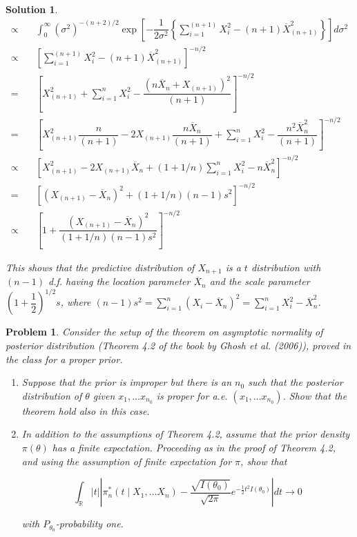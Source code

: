 \documentclass[12pt]{article}
\theoremstyle{problemstyle}
\newtheorem{pbm}{Problem}
\newtheorem*{solution*}{Solution}
\newenvironment{problem}{
\begin{tcolorbox}[colback=green!10!white,colframe=black!75!black, parbox = false]\begin{pbm} }{\end{pbm}\end{tcolorbox} }
\newcommand{\R}{\mathbb{R}}
\begin{document}
\begin{solution*}
\begin{align*}
        \propto \quad & \int_0^\infty (\sigma^2)^{-(n+2)/2} \exp\left[ -\dfrac{1}{2\sigma^2} \left\{ \sum_{i=1}^{(n+1)} X_i^2 - (n+1)\overline{X}_{(n+1)}^2 \right\}\right] d\sigma^2\\
        \propto \quad & \left[ \sum_{i=1}^{(n+1)} X_i^2 - (n+1)\overline{X}_{(n+1)}^2 \right]^{-n/2}\\
        = \quad & \left[ X_{(n+1)}^2 + \sum_{i=1}^{n} X_i^2 - \dfrac{(n\overline{X}_n + X_{(n+1)})^2}{(n+1)} \right]^{-n/2}\\
        = \quad & \left[ X_{(n+1)}^2 \dfrac{n}{(n+1)} - 2{X}_{(n+1)} \dfrac{n \overline{X}_n}{(n+1)} + \sum_{i=1}^{n} X_i^2 - \dfrac{n^2 \overline{X}_n^2}{(n+1)} \right]^{-n/2}\\
        \propto \quad & \left[ X_{(n+1)}^2 - 2 X_{(n+1)}\overline{X}_n + (1+1/n)\sum_{i=1}^n X_i^2 - n\overline{X}_n^2 \right]^{-n/2}\\
        = \quad & \left[ (X_{(n+1)} - \overline{X}_n)^2 + (1+1/n)(n-1)s^2 \right]^{-n/2}\\
        \propto \quad & \left[ 1 + \dfrac{(X_{(n+1)} - \overline{X}_n)^2}{(1+1/n)(n-1)s^2} \right]^{-n/2}
    \end{align*}
    \endgroup

    This shows that the predictive distribution of $X_{n+1}$ is a $t$ distribution with $(n-1)$ d.f. having the location parameter $\overline{X}_n$ and the scale parameter $\left( 1 + \dfrac{1}{2}\right)^{1/2}s$, where $(n-1)s^2 = \sum_{i=1}^n (X_i - \overline{X}_n)^2 = \sum_{i=1}^n X_i^2 - \overline{X}_n^2$. 

\end{solution*}
\pagebreak


\begin{problem}
    Consider the setup of the theorem on asymptotic normality of posterior distribution (Theorem 4.2 of the book by Ghosh et al. (2006)), proved in the class for a proper prior.
    \begin{enumerate}
        \item[(a)] Suppose that the prior is improper but there is an $n_0$ such that the posterior distribution of $\theta$ given $x_1, \dots x_{n_0}$ is proper for a.e. $(x_1, \dots x_{n_0})$. Show that the theorem hold also in this case.
        \item[(b)] In addition to the assumptions of Theorem 4.2, assume that the prior density $\pi(\theta)$ has a finite expectation. Proceeding as in the proof of Theorem 4.2, and using the assumption of finite expectation for $\pi$, show that 
        
        $$
        \int_{\R} \vert t\vert \left\vert \pi_n^\ast(t\mid X_1, \dots X_n) - \dfrac{\sqrt{I(\theta_0)}}{\sqrt{2\pi}} e^{-\frac{1}{2} t^2 I(\theta_0)} \right\vert dt \rightarrow 0
        $$

        \noindent with $P_{\theta_0}$-probability one.
    \end{enumerate}
\end{problem}
\end{document}
